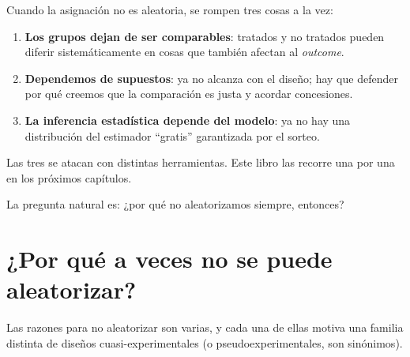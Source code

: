 \documentclass[
  letterpaper,
  DIV=11,
  numbers=noendperiod,
  oneside]{scrreprt}
\providecommand{\tightlist}{%
  \setlength{\itemsep}{0pt}\setlength{\parskip}{0pt}}\usepackage{longtable,booktabs,array}
\begin{document}
\begin{tcolorbox}[enhanced jigsaw, breakable, rightrule=.15mm, colbacktitle=quarto-callout-tip-color!10!white, bottomtitle=1mm, arc=.35mm, titlerule=0mm, left=2mm, toprule=.15mm, leftrule=.75mm, colback=white, opacitybacktitle=0.6, opacityback=0, colframe=quarto-callout-tip-color-frame, bottomrule=.15mm, coltitle=black, toptitle=1mm, title=\textcolor{quarto-callout-tip-color}{\faLightbulb}\hspace{0.5em}{Tip}]
Cuando la asignación no es aleatoria, se rompen tres cosas a la vez:

\begin{enumerate}
\def\labelenumi{\arabic{enumi}.}
\tightlist
\item
  \textbf{Los grupos dejan de ser comparables}: tratados y no tratados
  pueden diferir sistemáticamente en cosas que también afectan al
  \emph{outcome}.
\item
  \textbf{Dependemos de supuestos}: ya no alcanza con el diseño; hay que
  defender por qué creemos que la comparación es justa y acordar
  concesiones.
\item
  \textbf{La inferencia estadística depende del modelo}: ya no hay una
  distribución del estimador ``gratis'' garantizada por el sorteo.
\end{enumerate}

Las tres se atacan con distintas herramientas. Este libro las recorre
una por una en los próximos capítulos.
\end{tcolorbox}

La pregunta natural es: ¿por qué no aleatorizamos siempre, entonces?

\hypertarget{por-quuxe9-a-veces-no-se-puede-aleatorizar}{%
\section{¿Por qué a veces no se puede
aleatorizar?}\label{por-quuxe9-a-veces-no-se-puede-aleatorizar}}

Las razones para no aleatorizar son varias, y cada una de ellas motiva
una familia distinta de diseños cuasi-experimentales (o
pseudoexperimentales, son sinónimos).
\end{document}
